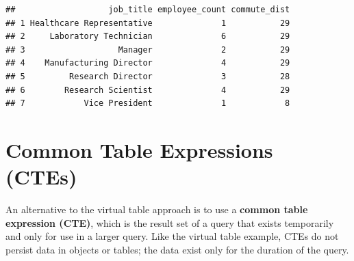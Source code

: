 \documentclass[
]{book}
\begin{document}
\begin{verbatim}
##                   job_title employee_count commute_dist
## 1 Healthcare Representative              1           29
## 2     Laboratory Technician              6           29
## 3                   Manager              2           29
## 4    Manufacturing Director              4           29
## 5         Research Director              3           28
## 6        Research Scientist              4           29
## 7            Vice President              1            8
\end{verbatim}

\hypertarget{common-table-expressions-ctes}{%
\section{Common Table Expressions (CTEs)}\label{common-table-expressions-ctes}}

An alternative to the virtual table approach is to use a \textbf{common table expression (CTE)}, which is the result set of a query that exists temporarily and only for use in a larger query. Like the virtual table example, CTEs do not persist data in objects or tables; the data exist only for the duration of the query.
\end{document}
